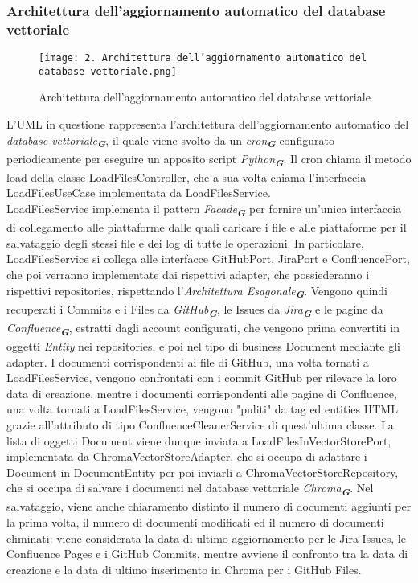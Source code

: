 \newpage


\subsubsection{Architettura dell'aggiornamento automatico del database vettoriale}
\label{sec:architettura_aggiornamento_database_vettoriale}

\begin{figure}[h]
    \centering
    \texttt{[image: 2. Architettura dell'aggiornamento automatico del database vettoriale.png]}
    \caption{Architettura dell'aggiornamento automatico del database vettoriale}
\end{figure}

L'UML in questione rappresenta l'architettura dell'aggiornamento automatico del \emph{database vettoriale}\textsubscript{\textbf{\textit{G}}}, il quale viene svolto da un \emph{cron}\textsubscript{\textbf{\textit{G}}} configurato periodicamente per eseguire un apposito script \emph{Python}\textsubscript{\textbf{\textit{G}}}. Il cron chiama il metodo load della classe LoadFilesController, che a sua volta chiama l'interfaccia LoadFilesUseCase implementata da LoadFilesService.\\
LoadFilesService implementa il pattern \emph{Facade}\textsubscript{\textbf{\textit{G}}} per fornire un'unica interfaccia di collegamento alle piattaforme dalle quali caricare i file e alle piattaforme per il salvataggio degli stessi file e dei log di tutte le operazioni. In particolare, LoadFilesService si collega alle interfacce GitHubPort, JiraPort e ConfluencePort, che poi verranno implementate dai rispettivi adapter, che possiederanno i rispettivi repositories, rispettando l'\emph{Architettura Esagonale}\textsubscript{\textbf{\textit{G}}}. Vengono quindi recuperati i Commits e i Files da \emph{GitHub}\textsubscript{\textbf{\textit{G}}}, le Issues da \emph{Jira}\textsubscript{\textbf{\textit{G}}} e le pagine da \emph{Confluence}\textsubscript{\textbf{\textit{G}}}, estratti dagli account configurati, che vengono prima convertiti in oggetti \emph{Entity} nei repositories, e poi nel tipo di business Document mediante gli adapter. I documenti corrispondenti ai file di GitHub, una volta tornati a LoadFilesService, vengono confrontati con i commit GitHub per rilevare la loro data di creazione, mentre i documenti corrispondenti alle pagine di Confluence, una volta tornati a LoadFilesService, vengono "puliti" da tag ed entities HTML grazie all'attributo di tipo ConfluenceCleanerService di quest'ultima classe. La lista di oggetti Document viene dunque inviata a LoadFilesInVectorStorePort, implementata da ChromaVectorStoreAdapter, che si occupa di adattare i Document in DocumentEntity per poi inviarli a ChromaVectorStoreRepository, che si occupa di salvare i documenti nel database vettoriale \emph{Chroma}\textsubscript{\textbf{\textit{G}}}. Nel salvataggio, viene anche chiaramento distinto il numero di documenti aggiunti per la prima volta, il numero di documenti modificati ed il numero di documenti eliminati: viene considerata la data di ultimo aggiornamento per le Jira Issues, le Confluence Pages e i GitHub Commits, mentre avviene il confronto tra la data di creazione e la data di ultimo inserimento in Chroma per i GitHub Files. \\
